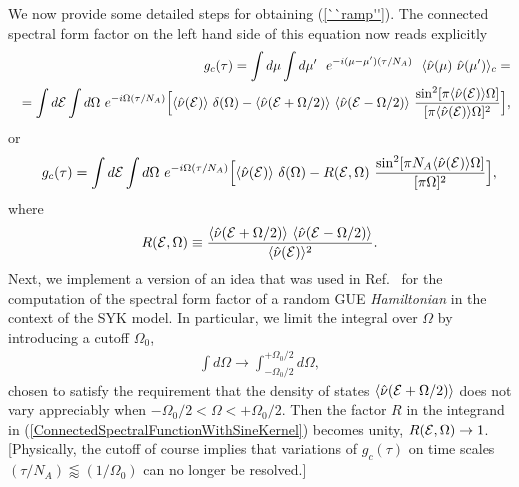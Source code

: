 \documentclass[aps,prb,preprint,onecolumn,amsmath,amssymb,superscriptaddress,eqsecnum,floatfix,scrartcl]{revtex4-1}
\begin{document}
\vspace {.5cm}
We now provide some detailed steps for obtaining (\ref{``ramp''}). The connected spectral form factor on the left hand side of this equation
now
reads explicitly 
\begin{eqnarray}
&& 
g_c(\tau)
= 
\int d\mu \int d \mu' 
\ \ e^{-i (\mu-\mu')(\tau/N_A)} \ \ 
\langle{\hat \nu}(\mu) \ {\hat \nu}(\mu')\rangle_c
= \\ \nonumber
&& =
\int d{\cal E} \int d\Omega \ 
 e^{-i \Omega (\tau/N_A)} 
\Bigl [
\langle {\hat \nu}({\cal E})\rangle \ 
\delta(\Omega) 
-
\langle{\hat  \nu}({\cal E}+\Omega/2)\rangle \    \langle{ \hat \nu}({\cal E}-\Omega/2)\rangle  \ 
{\sin^2[\pi  \langle {\hat \nu }({\cal E})\rangle \Omega]\over
[\pi \langle  {\hat \nu}({\cal E})\rangle \Omega]^2}
\Bigr ],
\end{eqnarray}
or
\begin{eqnarray}
&& 
\label{ConnectedSpectralFunctionWithSineKernel}
 \ g_c(\tau) =
\int d{\cal E} \int d\Omega \ 
 e^{-i \Omega (\tau/N_A)} 
\Bigl [
\langle {\hat \nu}({\cal E})\rangle \ \delta(\Omega) 
-
R({\cal E},\Omega) \ 
{\sin^2[\pi N_A \langle{\hat \nu}({\cal E})\rangle \Omega]\over
[\pi  \Omega]^2}
\Bigr ],
\end{eqnarray}
where
\begin{eqnarray}
R({\cal E},\Omega)
\equiv
{
\langle{ \hat \nu}({\cal E}+\Omega/2)\rangle \    \langle{\hat  \nu}({\cal E}-\Omega/2)\rangle
\over
 \langle {\hat \nu}({\cal E})\rangle^2
}.
\end{eqnarray}
Next, we  implement  a version of an  idea that was  used in Ref.\ 
for the computation of the spectral form factor of a 
random GUE {\it Hamiltonian}  in the context of the SYK model.
In particular, we limit the integral over $\Omega$ by introducing a cutoff $\Omega_0$,
\begin{eqnarray}
\int d\Omega
\to 
\int_{-\Omega_0/2}^{+\Omega_0/2} d\Omega,
\end{eqnarray}
chosen to satisfy  the requirement that the density of states
$\langle{\hat  \nu}({\cal E}+\Omega/2)\rangle$ does not vary appreciably when $-\Omega_0/2 < \Omega < +\Omega_0/2$.
Then the factor  $R$ in the integrand  in
(\ref{ConnectedSpectralFunctionWithSineKernel}) becomes unity,
 $R({\cal E},\Omega)\to 1$.
[Physically, the cutoff of course implies  that variations of $g_c(\tau)$ on time scales $(\tau/N_A) \lessapprox (1/\Omega_0)$ can no longer be resolved.]
\end{document}
